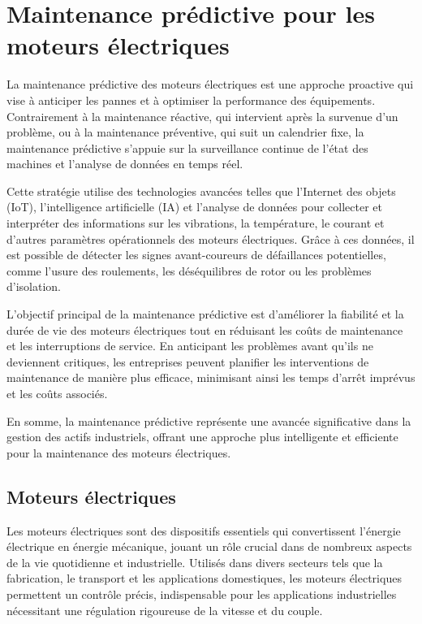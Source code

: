 \section{Maintenance prédictive pour les  moteurs électriques }

La maintenance prédictive des moteurs électriques est une approche proactive
qui vise à anticiper les pannes et à optimiser la performance des équipements.
Contrairement à la maintenance réactive, qui intervient après la survenue d'un
problème, ou à la maintenance préventive, qui suit un calendrier fixe, la
maintenance prédictive s'appuie sur la surveillance continue de l'état des
machines et l'analyse de données en temps réel.

Cette stratégie utilise des technologies avancées telles que l'Internet des
objets (IoT), l'intelligence artificielle (IA) et l'analyse de données pour
collecter et interpréter des informations sur les vibrations, la température,
le courant et d'autres paramètres opérationnels des moteurs électriques. Grâce
à ces données, il est possible de détecter les signes avant-coureurs de
défaillances potentielles, comme l'usure des roulements, les déséquilibres de
rotor ou les problèmes d'isolation.

L'objectif principal de la maintenance prédictive est d'améliorer la fiabilité
et la durée de vie des moteurs électriques tout en réduisant les coûts de
maintenance et les interruptions de service. En anticipant les problèmes avant
qu'ils ne deviennent critiques, les entreprises peuvent planifier les
interventions de maintenance de manière plus efficace, minimisant ainsi les
temps d'arrêt imprévus et les coûts associés.

En somme, la maintenance prédictive représente une avancée significative dans
la gestion des actifs industriels, offrant une approche plus intelligente et
efficiente pour la maintenance des moteurs électriques.

\subsection{Moteurs électriques}

Les moteurs électriques sont des dispositifs essentiels qui convertissent
l'énergie électrique en énergie mécanique, jouant un rôle crucial dans de
nombreux aspects de la vie quotidienne et industrielle. Utilisés dans divers
secteurs tels que la fabrication, le transport et les applications domestiques,
les moteurs électriques permettent un contrôle précis, indispensable pour les
applications industrielles nécessitant une régulation rigoureuse de la vitesse
et du couple.

